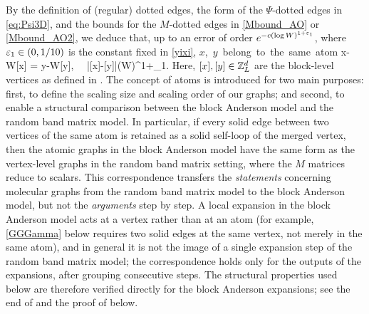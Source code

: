 By the definition of (regular) dotted edges, the form of the $\Psi$-dotted edges in \eqref{eq:Psi3D}, and the bounds for the $M$-dotted edges in \eqref{Mbound_AO} or \eqref{Mbound_AO2}, we deduce that, up to an error of order $e^{-c(\log W)^{1+{\varepsilon}_1}}$, where ${\varepsilon}_1\in(0,1/10)$ is the constant fixed in \eqref{yixi}, %
\be\label{scaleatom}
 \hbox{$x$, $y$ belong to the same atom} \implies  x-W[x] = y-W[y],\  \ |[x]-[y]|\le (\log W)^{1+\e_1}.
\ee
Here, $[x],[y]\in {\mathbb Z}_L^d$ are the block-level vertices as defined in . 
The concept of atoms is introduced for two main purposes: first, to define the scaling size and scaling order of our graphs; and second, to enable a structural comparison between the block Anderson model and the random band matrix model. 
In particular, if every solid edge between two vertices of the same atom is retained as a solid self-loop of the merged vertex, then the atomic graphs in the block Anderson model have the same form as the vertex-level graphs in the random band matrix setting, where the $M$ matrices reduce to scalars. This correspondence transfers the \emph{statements} concerning molecular graphs from the random band matrix model to the block Anderson model, but not the \emph{arguments} step by step. A local expansion in the block Anderson model acts at a vertex rather than at an atom (for example, \eqref{GGGamma} below requires two solid edges at the same vertex, not merely in the same atom), and in general it is not the image of a single expansion step of the random band matrix model; the correspondence holds only for the outputs of the expansions, after grouping consecutive steps. The structural properties used below are therefore verified directly for the block Anderson expansions; see the end of  and the proof of  below.





